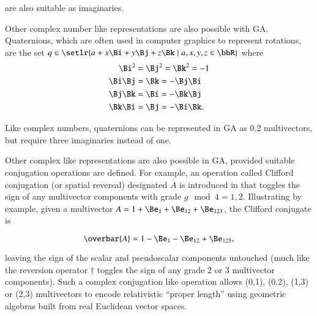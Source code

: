 are also suitable as imaginaries.

Other complex number like representations are also possible with GA.
Quaternions, which are often used in computer graphics to represent rotations,
are the set \( q \in \setlr{ a + x \Bi + y \Bj + z \Bk \mid a, x, y, z \in \bbR} \) where
\begin{equation}\label{eqn:2dMultiplication:240}
\begin{aligned}
\Bi^2 &= \Bj^2 = \Bk^2 = -1 \\
\Bi \Bj &= \Bk = -\Bj \Bi \\
\Bj \Bk &= \Bi = -\Bk \Bj \\
\Bk \Bi &= \Bj = -\Bi \Bk.
\end{aligned}
\end{equation}

Like complex numbers, quaternions can be represented in GA as 0,2 multivectors, but require three imaginaries instead of one.

Other complex like representations are also possible in GA, provided suitable conjugation operations are defined.
For example,
an operation called Clifford conjugation (or spatial reversal) designated \( \overbar{A} \) is introduced in \citep{baylis2004electrodynamics}
that toggles the sign of any multivector components with grade \( g \mod 4 = 1,2 \).
Illustrating by example, given a multivector
\( A = 1 + \Be_1 + \Be_{12} + \Be_{123} \), the Clifford conjugate is

\begin{dmath}\label{eqn:galiterature:60}
\overbar{A} = 1 - \Be_1 - \Be_{12} + \Be_{123},
\end{dmath}

leaving the sign of the scalar and pseudoscalar components untouched (much like the reversion operator \( \dagger \) toggles the sign of any grade 2 or 3 multivector components).
Such a complex conjugation like operation allows (0,1), (0,2), (1,3) or (2,3) multivectors to encode relativistic ``proper length'' using geometric algebras built from real Euclidean vector spaces.

